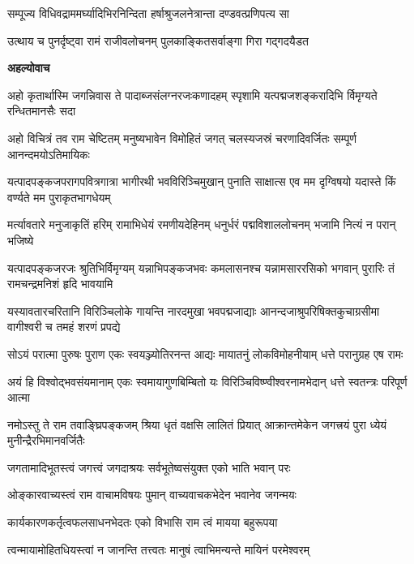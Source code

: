 \twolineshloka
{सम्पूज्य विधिवद्राममर्घ्यादिभिरनिन्दिता}
{हर्षाश्रुजलनेत्रान्ता दण्डवत्प्रणिपत्य सा} %

\twolineshloka
{उत्थाय च पुनर्दृष्ट्वा रामं राजीवलोचनम्}
{पुलकाङ्कितसर्वाङ्गा गिरा गद्गदयैडत} %

\textbf{अहल्योवाच}

\fourlineindentedshloka
{अहो कृतार्थास्मि जगन्निवास ते}
{पादाब्जसंलग्नरजःकणादहम्}
{स्पृशामि यत्पद्मजशङ्करादिभि\-}
{र्विमृग्यते रन्धितमानसैः सदा} %

\fourlineindentedshloka
{अहो विचित्रं तव राम चेष्टितम्}
{मनुष्यभावेन विमोहितं जगत्}
{चलस्यजस्रं चरणादिवर्जितः}
{सम्पूर्ण आनन्दमयोऽतिमायिकः} %

\fourlineindentedshloka
{यत्पादपङ्कजपरागपवित्रगात्रा}
{भागीरथी भवविरिञ्चिमुखान् पुनाति}
{साक्षात्स एव मम दृग्विषयो यदास्ते}
{किं वर्ण्यते मम पुराकृतभागधेयम्} %

\fourlineindentedshloka
{मर्त्यावतारे मनुजाकृतिं हरिम्}
{रामाभिधेयं रमणीयदेहिनम्}
{धनुर्धरं पद्मविशाललोचनम्}
{भजामि नित्यं न परान् भजिष्ये} %

\fourlineindentedshloka
{यत्पादपङ्कजरजः श्रुतिभिर्विमृग्यम्}
{यन्नाभिपङ्कजभवः कमलासनश्च}
{यन्नामसाररसिको भगवान् पुरारिः}
{तं रामचन्द्रमनिशं हृदि भावयामि} %

\fourlineindentedshloka
{यस्यावतारचरितानि विरिञ्चिलोके}
{गायन्ति नारदमुखा भवपद्मजाद्याः}
{आनन्दजाश्रुपरिषिक्तकुचाग्रसीमा}
{वागीश्वरी च तमहं शरणं प्रपद्ये} %

\fourlineindentedshloka
{सोऽयं परात्मा पुरुषः पुराण}
{एकः स्वयञ्ज्योतिरनन्त आद्यः}
{मायातनुं लोकविमोहनीयाम्}
{धत्ते परानुग्रह एष रामः} %

\fourlineindentedshloka
{अयं हि विश्वोद्भवसंयमानाम्}
{एकः स्वमायागुणबिम्बितो यः}
{विरिञ्चिविष्ण्वीश्वरनामभेदान्}
{धत्ते स्वतन्त्रः परिपूर्ण आत्मा} %

\fourlineindentedshloka
{नमोऽस्तु ते राम तवाङ्घ्रिपङ्कजम्}
{श्रिया धृतं वक्षसि लालितं प्रियात्}
{आक्रान्तमेकेन जगत्त्रयं पुरा}
{ध्येयं मुनीन्द्रैरभिमानवर्जितैः} %

\twolineshloka
{जगतामादिभूतस्त्वं जगत्त्वं जगदाश्रयः}
{सर्वभूतेष्वसंयुक्त एको भाति भवान् परः} %

\twolineshloka
{ओङ्कारवाच्यस्त्वं राम वाचामविषयः पुमान्}
{वाच्यवाचकभेदेन भवानेव जगन्मयः} %

\twolineshloka
{कार्यकारणकर्तृत्वफलसाधनभेदतः}
{एको विभासि राम त्वं मायया बहुरूपया} %

\twolineshloka
{त्वन्मायामोहितधियस्त्वां न जानन्ति तत्त्वतः}
{मानुषं त्वाभिमन्यन्ते मायिनं परमेश्वरम्} %

